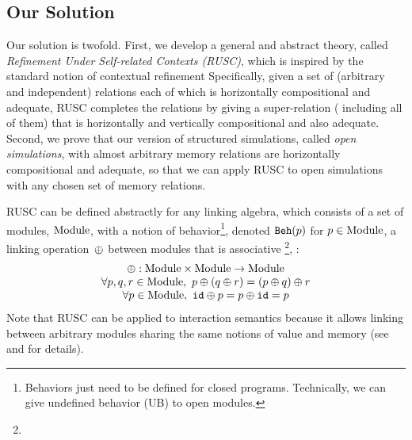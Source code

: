 \subsection{Our Solution}
\label{sec:overview-verification:solution}

%
Our solution is twofold. First, we develop a general and abstract
theory, called \emph{Refinement Under Self-related Contexts (RUSC)},
which is inspired by the standard notion of contextual refinement
Specifically, given a set of (arbitrary and independent)
relations each of which is horizontally compositional and adequate,
RUSC completes the relations by giving a super-relation (\ie
including all of them) that is horizontally and vertically
compositional and also adequate. Second, we prove that
our version of structured simulations, called \emph{open simulations},
with almost arbitrary memory relations
are horizontally compositional and adequate,
so that we can apply RUSC to open simulations with any chosen set of memory relations.

%
RUSC can be defined abstractly for any linking algebra, which consists
of a set of modules, $\textrm{Module}$, with a notion of behavior\footnote{Behaviors just need to be defined for closed programs.
  Technically, we can give undefined behavior (UB) to open modules.
}, denoted
$\mathtt{Beh}({p})$ for $p\in\textrm{Module}$, a linking operation~$\oplus$ between modules
that is associative%
\footnote{},
:
\[
\begin{array}{c}
\oplus: \textrm{Module} \times \textrm{Module} \rightarrow \textrm{Module} \\
\forall p,q,r\in\textrm{Module},~p \oplus (q \oplus r) = (p \oplus q) \oplus r \\
\forall p \in\textrm{Module},~ \texttt{id} \oplus p = p \oplus \texttt{id} = p \\
\end{array}
\]
Note that RUSC can be applied to interaction semantics because it
allows linking between arbitrary modules sharing the same notions
of value and memory (see  and  for details).

